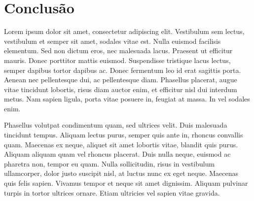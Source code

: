 \clearpage


\chapter{Conclusão}

Lorem ipsum dolor sit amet, consectetur adipiscing elit. Vestibulum sem lectus, vestibulum et semper sit amet, sodales vitae est. Nulla euismod facilisis elementum. Sed non dictum eros, nec malesuada lacus. Praesent ut efficitur mauris. Donec porttitor mattis euismod. Suspendisse tristique lacus lectus, semper dapibus tortor dapibus ac. Donec fermentum leo id erat sagittis porta. Aenean nec pellentesque dui, ac pellentesque diam. Phasellus placerat, augue vitae tincidunt lobortis, risus diam auctor enim, et efficitur nisl dui interdum metus. Nam sapien ligula, porta vitae posuere in, feugiat at massa. In vel sodales enim.

Phasellus volutpat condimentum quam, sed ultrices velit. Duis malesuada tincidunt tempus. Aliquam lectus purus, semper quis ante in, rhoncus convallis quam. Maecenas ex neque, aliquet sit amet lobortis vitae, blandit quis purus. Aliquam aliquam quam vel rhoncus placerat. Duis nulla neque, euismod ac pharetra non, tempor eu quam. Nulla sollicitudin, risus in vestibulum ullamcorper, dolor justo suscipit nisl, at luctus nunc ex eget neque. Maecenas quis felis sapien. Vivamus tempor et neque sit amet dignissim. Aliquam pulvinar turpis in tortor ultrices ornare. Etiam ultricies vel sapien vitae gravida.



